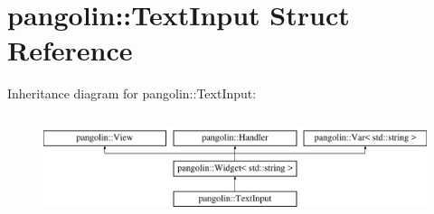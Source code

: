 \hypertarget{structpangolin_1_1_text_input}{}\section{pangolin\+:\+:Text\+Input Struct Reference}
\label{structpangolin_1_1_text_input}
Inheritance diagram for pangolin\+:\+:Text\+Input\+:\begin{figure}[H]
\begin{center}
\leavevmode
\includegraphics[height=2.962963cm]{structpangolin_1_1_text_input}
\end{center}
\end{figure}

